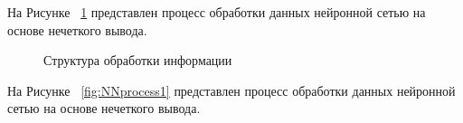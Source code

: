 На Рисунке ~\cref{fig:FLprocess} представлен процесс обработки данных нейронной сетью на основе нечеткого вывода. 
\begin{figure}[ht]
    \caption{Структура обработки информации}\label{fig:FLprocess}
\end{figure}
На Рисунке ~\cref{fig:NNprocess1} представлен процесс обработки данных нейронной сетью на основе нечеткого вывода. 
